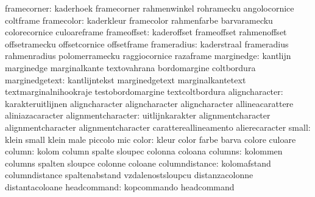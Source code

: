               framecorner: kaderhoek                 framecorner
                           rahmenwinkel              rohramecku
                           angolocornice             coltframe
               framecolor: kaderkleur                framecolor
                           rahmenfarbe               barvaramecku
                           colorecornice             culoareframe
              frameoffset: kaderoffset               frameoffset
                           rahmenoffset              offsetramecku
                           offsetcornice             offsetframe
              frameradius: kaderstraal               frameradius
                           rahmenradius              polomerramecku
                           raggiocornice             razaframe
               marginedge: kantlijn                  marginedge
                           marginalkante             textovahrana
                           bordomargine              coltbordura
           marginedgetext: kantlijntekst             marginedgetext
                           marginalkantetext         textmarginalnihookraje
                           testobordomargine         textcoltbordura
           aligncharacter: karakteruitlijnen         aligncharacter
                           aligncharacter            aligncharacter
                           allineacarattere          aliniazacaracter %
       alignmentcharacter: uitlijnkarakter           alignmentcharacter
                           alignmentcharacter        alignmentcharacter
                           carattereallineamento     alierecaracter %
                    small: klein                     small
                           klein                     male
                           piccolo                   mic
                    color: kleur                     color
                           farbe                     barva
                           colore                    culoare
                   column: kolom                     column
                           spalte                    sloupec
                           colonna                   coloana
                  columns: kolommen                  columns
                           spalten                   sloupce
                           colonne                   coloane
           columndistance: kolomafstand              columndistance
                           spaltenabstand            vzdalenostsloupcu
                           distanzacolonne           distantacoloane
              headcommand: kopcommando               headcommand
